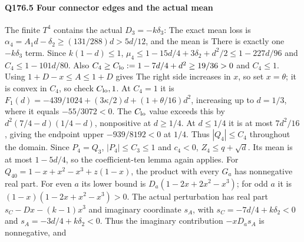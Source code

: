 \paragraph{Q176.5 Four connector edges and the actual mean}\label{part:Q176.5}
The finite $T^4$ contains the actual $D_3=\allowbreak -k\delta_3$:
The exact mean loss is
$\alpha_4=\allowbreak A_1d-\delta_2\ge\allowbreak (131/288)d>\allowbreak 5d/12$, and the mean is
There is exactly one $-k\delta_3$ term. Since $k(1-d)\le\allowbreak 1$,
$\mu_4\le\allowbreak 1-15d/4+3\delta_2+d^2/2\le\allowbreak 1-227d/96$ and
$C_4\le\allowbreak 1-101d/80$.
Also $C_4\ge\allowbreak  C_{\rm lo}:=\allowbreak 1-7d/4+d^2\ge\allowbreak 19/36>\allowbreak 0$ and $C_4\le\allowbreak 1$.
Using $1+D-x\le\allowbreak  A\le\allowbreak 1+D$ gives
The right side increases in $x$, so set $x=\allowbreak \theta$; it is convex in
$C_4$, so check $C_{\rm lo},\allowbreak 1$.
At $C_4=\allowbreak 1$ it is
$F_1(d)=\allowbreak -439/1024+(3\kappa/2)d+(1+\theta/16)d^2$,
increasing up to $d=\allowbreak 1/3$, where it equals $-55/3072<\allowbreak 0$.
The $C_{\rm lo}$ value exceeds this by
$d^2(7/4-d)(1/4-d)$, nonpositive at $d\ge\allowbreak 1/4$.
At $d\le\allowbreak 1/4$ it is at most $7d^2/16$, giving the endpoint upper
$-939/8192<\allowbreak 0$ at $1/4$. Thus $|Q_4|\le\allowbreak  C_4$ throughout the domain.
Since $P_4=\allowbreak Q_3$, $|P_4|\le\allowbreak  C_3\le\allowbreak 1$ and $c_4<\allowbreak 0$,
$Z_4\le\allowbreak  q+\sqrt d$. Its mean is at most $1-5d/4$, so the
coefficient-ten lemma again applies.
For $Q_{40}=\allowbreak 1-x+x^2-x^3+z(1-x)$, the product with every $G_a$
has nonnegative real part. For even $a$ its lower bound is
$D_a(1-2x+2x^2-x^3)$; for odd $a$ it is
$(1-x)(1-2x+x^2-x^3)>\allowbreak 0$.
The actual perturbation has real part $s_C-Dx-(k-1)x^3$ and imaginary
coordinate $s_A$, with
$s_C=\allowbreak -7d/4+k\delta_2<\allowbreak 0$ and $s_A=\allowbreak -3d/4+k\delta_2<\allowbreak 0$.
Thus the imaginary contribution $-xD_as_A$ is nonnegative, and
